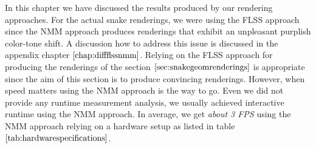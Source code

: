 In this chapter we have discussed the results produced by our rendering approaches. For the actual snake renderings, we were using the FLSS approach since the NMM approach produces renderings that exhibit an unpleasant purplish color-tone shift. A discussion how to address this issue is discussed in the appendix chapter $\ref{chap:diffflssnmm}$. Relying on the FLSS approach for producing the renderings of the section $\ref{sec:snakegeomrenderings}$ is appropriate since the aim of this section is to produce convincing renderings. However, when speed matters using the NMM approach is the way to go. Even we did not provide any runtime measurement analysis, we usually achieved interactive runtime using the NMM approach. In average, we get \emph{about 3 FPS} using the NMM approach relying on a hardware setup as listed in table $\ref{tab:hardwarespecifications}$.